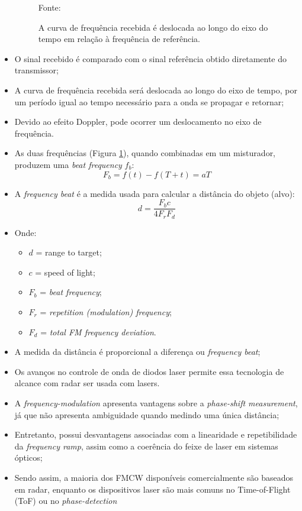 \documentclass[xcolor=dvipsnames, aspectratio=169]{beamer}
\begin{document}
\begin{frame}
\begin{itemize}
\begin{figure}
            {Fonte: \cite{everett1995sensors}}
            \caption{A curva de frequência recebida é deslocada ao longo do eixo do tempo em relação à frequência de referência.}
            \label{fig:curva_de_freq}
        \end{figure}
        \item O sinal recebido é comparado com o sinal referência obtido diretamente do transmissor;
        \item A curva de frequência recebida será deslocada ao longo do eixo de tempo, por um período igual ao tempo necessário para a onda se propagar e retornar;
        \item Devido ao efeito Doppler, pode ocorrer um deslocamento no eixo de frequência.
        \item As duas frequências (Figura \ref{fig:curva_de_freq}), quando combinadas em um misturador, produzem uma \textit{beat frequency} $f_{b}$:
        \begin{equation}
            F_{b} = f(t) - f(T + t) = aT
        \end{equation}
        \item A \textit{frequency beat} é a medida usada para calcular a distância do objeto (alvo):
        \begin{equation}
            d = \frac{F_{b}c}{4F_{r}F{_d}}
        \end{equation}
        \item Onde:
        \begin{itemize}
            \item[] $d$ = range to target;
            \item[] $c$ = speed of light;
            \item[] $F_{b}$ = \textit{beat frequency};
            \item[] $F_{r}$ = \textit{repetition (modulation) frequency};
            \item[] $F_{d}$ = \textit{total FM frequency deviation}.
        \end{itemize}
        \item A medida da distância é proporcional a diferença ou \textit{frequency beat};
        \item Os avanços no controle de onda de diodos laser permite essa tecnologia de alcance com radar ser usada com lasers.
        \item A \textit{frequency-modulation} apresenta vantagens sobre a \textit{phase-shift measurement}, já que não apresenta ambiguidade quando medindo uma única distância;
        \item Entretanto, possui desvantagens associadas com a linearidade e repetibilidade da \textit{frequency ramp}, assim como a coerência do feixe de laser em sistemas ópticos;
        \item Sendo assim, a maioria dos FMCW disponíveis comercialmente são baseados em radar, enquanto os dispositivos laser são mais comuns no Time-of-Flight (ToF) ou no \textit{phase-detection}
	\end{itemize}
\end{frame}
\end{document}
